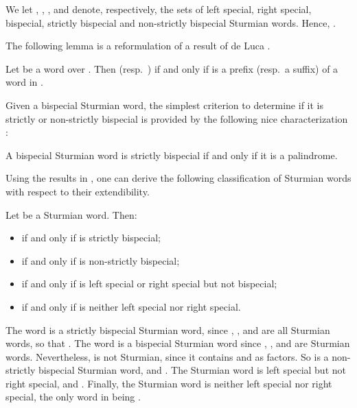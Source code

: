 \documentclass{llncs}
\begin{document}
We let , , ,  and  denote, respectively, the sets of left special, right special, bispecial, strictly bispecial and non-strictly bispecial Sturmian words. Hence, .

The following lemma is a reformulation of a result of de Luca \cite{Del97}.

\begin{lemma}\label{lem:prefsuf}
Let  be a word over . Then  (resp.~) if and only if  is a prefix (resp.~a suffix) of a word in .
\end{lemma}

Given a bispecial Sturmian word, the simplest criterion to determine if it is strictly or non-strictly bispecial  is provided by the following nice characterization \cite{DelMi94}:

\begin{proposition}\label{prop:sturmstrispe}
 A bispecial Sturmian word is strictly bispecial if and only if it is a palindrome.
\end{proposition}

Using the results in \cite{DelMi94}, one can derive the following classification of Sturmian words with respect to their extendibility.

\begin{proposition}\label{prop:bisp}
 Let  be a Sturmian word. Then:
 
\begin{itemize}
\item   if and only if  is strictly bispecial;
\item   if and only if  is non-strictly bispecial;
\item   if and only if  is left special or right special but not bispecial;
\item   if and only if  is neither left special nor right special.
\end{itemize}
\end{proposition}

\begin{example}
The word  is a strictly bispecial Sturmian word, since , ,  and  are all Sturmian words, so that . The word  is a bispecial Sturmian word since , ,  and  are Sturmian words. Nevertheless,  is not Sturmian, since it contains  and  as factors. So  is a non-strictly bispecial Sturmian word, and . The Sturmian word  is left special but not right special, and . Finally, the Sturmian word  is neither left special nor right special, the only word in  being .
\end{example}
\end{document}
